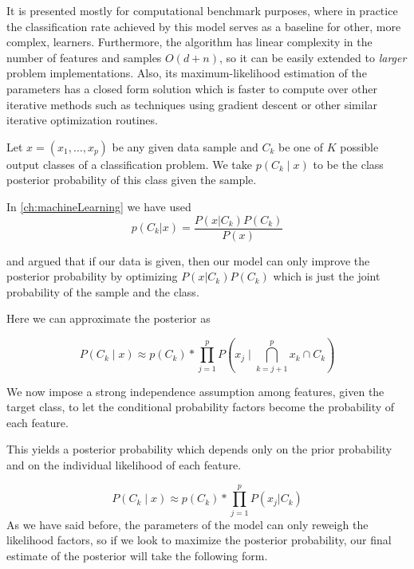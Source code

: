 It is presented mostly for computational benchmark purposes, where in practice the classification rate achieved by this model serves as a baseline for other, more complex, learners.
Furthermore, the algorithm has linear complexity in the number of features and samples $O(d+n)$, so it can be easily extended to \textit{larger} problem implementations.
Also, its maximum-likelihood estimation of the parameters has a closed form solution which is faster to compute over other iterative methods such as techniques using gradient descent or other similar iterative optimization routines.

Let $x = (x_1,\ldots,x_p)$ be any given data sample and $C_k$ be one of $K$ possible output classes of a classification problem.
We take $p(C_k \mid x)$ to be the class posterior probability of this class given the sample.

In \cref{ch:machineLearning}
we have used
\begin{equation}
\label{eq:posteriorProbabilties}
p(C_k| x) = \frac{P(x|C_k)P(C_k)}{P(x)}
\end{equation}


and argued that if our data is given, then our model can only improve the posterior probability by optimizing $P(x|C_k)P(C_k)$ which is just the joint probability of the sample and the class.

Here we can approximate the posterior as

\begin{equation}
\label{eq:posteriorProbabilityDecomposition1}
P(C_k \mid x) \approx p(C_k) * \prod_{j=1}^{p}  P(x_j \mid \bigcap_{k=j+1}^{p} x_k \cap C_k)
\end{equation}


We now impose a strong independence assumption among features, given the target class, to let the conditional probability factors become the probability of each feature. %

This yields a posterior probability which depends only on the prior probability and on the individual likelihood of each feature.

\begin{equation}\label{eq:posteriorProbabilityDecomposition2}
P(C_k \mid x) \approx p(C_k) * \prod_{j=1}^{p}  P(x_j | C_k)
\end{equation}
As we have said before, the parameters of the model can only reweigh the likelihood factors, so if we look to maximize the posterior probability, our final estimate of the posterior will take the following form.

